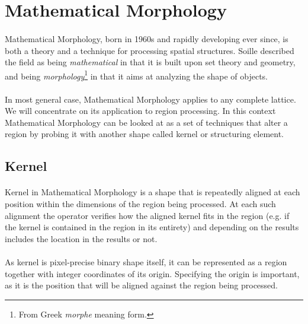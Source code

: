 \section{Mathematical Morphology}

\paragraph*{}
Mathematical Morphology, born in 1960s and rapidly developing ever since, is both a theory and a technique for processing spatial structures. Soille described\cite{Soille03} the field as being \textit{mathematical} in that it is built upon set theory and geometry, and being \textit{morphology}\footnote{From Greek \textit{morphe} meaning form.} in that it aims at analyzing the shape of objects.

\paragraph*{}
In most general case, Mathematical Morphology applies to any complete lattice. We will concentrate on its application to region processing. In this context Mathematical Morphology can be looked at as a set of techniques that alter a region by probing it with another shape called kernel or structuring element.

\subsection{Kernel}

\paragraph*{}
Kernel in Mathematical Morphology is a shape that is repeatedly aligned at each position within the dimensions of the region being processed. At each such alignment the operator verifies how the aligned kernel fits in the region (e.g. if the kernel is contained in the region in its entirety) and depending on the results includes the location in the results or not.

\paragraph*{}
As kernel is pixel-precise binary shape itself, it can be represented as a region together with integer coordinates of its origin. Specifying the origin is important, as it is the position that will be aligned against the region being processed.


